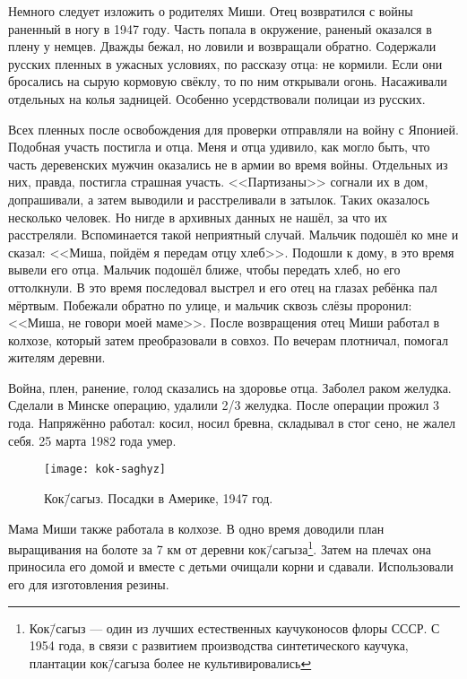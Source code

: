 Немного следует изложить о родителях Миши. Отец возвратился с войны раненный в ногу в 1947 году. Часть попала в окружение, раненый оказался в плену у немцев. Дважды бежал, но ловили и возвращали обратно. Содержали русских пленных в ужасных условиях, по рассказу отца: не кормили. Если они бросались на сырую кормовую свёклу, то по ним открывали огонь. Насаживали отдельных на колья задницей. Особенно усердствовали полицаи из русских. 

Всех пленных после освобождения для проверки отправляли на войну с Японией. Подобная участь постигла и отца. Меня и отца удивило, как могло быть, что часть деревенских мужчин оказались не в армии во время войны. Отдельных из них, правда, постигла страшная участь. <<Партизаны>> согнали их в дом, допрашивали, а затем выводили и расстреливали в затылок. Таких оказалось несколько человек. Но нигде в архивных данных не нашёл, за что их расстреляли. Вспоминается такой неприятный случай. Мальчик подошёл ко мне и сказал: <<Миша, пойдём я передам отцу хлеб>>. Подошли к дому, в это время вывели его отца. Мальчик подошёл ближе, чтобы передать хлеб, но его оттолкнули. В это время последовал выстрел и его отец на глазах ребёнка пал мёртвым. Побежали обратно по улице, и мальчик сквозь слёзы проронил: <<Миша, не говори моей маме>>. 
После возвращения отец Миши работал в колхозе, который затем преобразовали в совхоз. По вечерам плотничал, помогал жителям деревни.

Война, плен, ранение, голод сказались на здоровье отца. Заболел раком желудка. Сделали в Минске операцию, удалили 2/3 желудка. После операции прожил 3 года. Напряжённо работал: косил, носил бревна, складывал в стог сено, не жалел себя. 25 марта 1982 года умер.

\begin{wrapfigure}{O}{.4\textwidth}
\centering
\texttt{[image: kok-saghyz]}
\caption[Кок\=/сагыз. Посадки в Америке, 1947 год.]{Кок\=/сагыз. Посадки в Америке, 1947 год\footnotemark.}
\label{fig:kok-saghyz}
\end{wrapfigure}

Мама Миши также работала в колхозе. В одно время доводили план выращивания на болоте за 7 км от деревни кок\=/сагыза\footnote{Кок\=/сагыз — один из лучших естественных каучуконосов флоры СССР. С 1954 года, в связи с развитием производства синтетического каучука, плантации кок\=/сагыза более не культивировались}. Затем на плечах она приносила его домой и вместе с детьми очищали корни и сдавали. Использовали его для изготовления резины.

